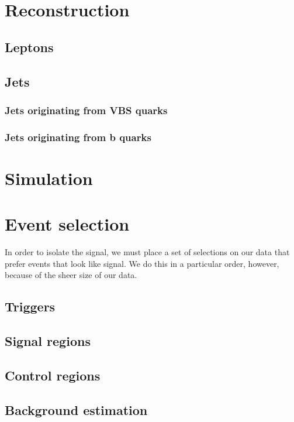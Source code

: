 \section{Reconstruction}
\subsection{Leptons}
\subsection{Jets}
\subsubsection{Jets originating from VBS quarks}
\subsubsection{Jets originating from b quarks}

\section{Simulation}

\section{Event selection}
In order to isolate the signal, we must place a set of selections on our data that prefer events that look like signal. 
We do this in a particular order, however, because of the sheer size of our data. 
\subsection{Triggers}
\subsection{Signal regions}
\subsection{Control regions}
\subsection{Background estimation}

